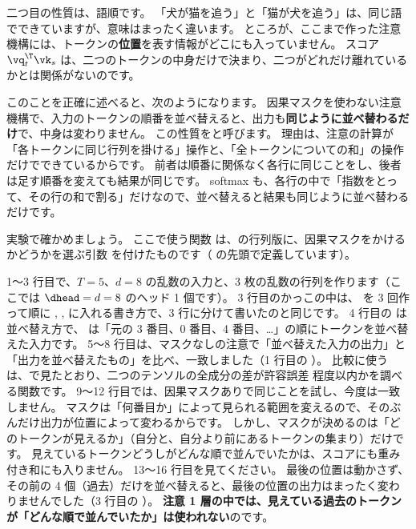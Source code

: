 二つ目の性質は、語順です。
「犬が猫を追う」と「猫が犬を追う」は、同じ語でできていますが、意味はまったく違います。
ところが、ここまで作った注意機構には、トークンの\textbf{位置}を表す情報がどこにも入っていません。
スコア $\vq_t^\T\vk_s$ は、二つのトークンの中身だけで決まり、二つがどれだけ離れているかとは関係がないのです。

このことを正確に述べると、次のようになります。
因果マスクを使わない注意機構で、入力のトークンの順番を並べ替えると、出力も\textbf{同じように並べ替わるだけ}で、中身は変わりません。
この性質をと呼びます。
理由は、注意の計算が「各トークンに同じ行列を掛ける」操作と、「全トークンについての和」の操作だけでできているからです。
前者は順番に関係なく各行に同じことをし、後者は足す順番を変えても結果が同じです。
softmax も、各行の中で「指数をとって、その行の和で割る」だけなので、並べ替えると結果も同じように並べ替わるだけです。

実験で確かめましょう。
ここで使う関数  は、の行列版に、因果マスクをかけるかどうかを選ぶ引数  を付けたものです（ の先頭で定義しています）。


1〜3 行目で、$T=5$、$d=8$ の乱数の入力と、3 枚の乱数の行列を作ります（ここでは $\dhead=d=8$ のヘッド 1 個です）。
3 行目のかっこの中は、 を 3 回作って順に , ,  に入れる書き方で、3 行に分けて書いたのと同じです。
4 行目の  は並べ替え方で、 は「元の 3 番目、0 番目、4 番目、\dots」の順にトークンを並べ替えた入力です。
5〜8 行目は、マスクなしの注意で「並べ替えた入力の出力」と「出力を並べ替えたもの」を比べ、一致しました（1 行目の ）。
比較に使う  は、で見たとおり、二つのテンソルの全成分の差が許容誤差  程度以内かを調べる関数です。
9〜12 行目では、因果マスクありで同じことを試し、今度は一致しません。
マスクは「何番目か」によって見られる範囲を変えるので、そのぶんだけ出力が位置によって変わるからです。
しかし、マスクが決めるのは「どのトークンが見えるか」（自分と、自分より前にあるトークンの集まり）だけです。
見えているトークンどうしがどんな順で並んでいたかは、スコアにも重み付き和にも入りません。
13〜16 行目を見てください。
最後の位置は動かさず、その前の 4 個（過去）だけを並べ替えると、最後の位置の出力はまったく変わりませんでした（3 行目の ）。
\textbf{注意 1 層の中では、見えている過去のトークンが「どんな順で並んでいたか」は使われない}のです。

